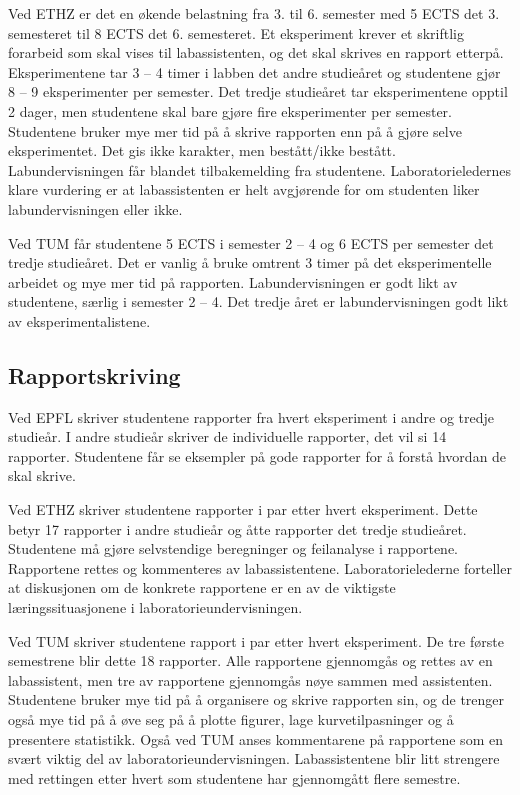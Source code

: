 \documentclass{article}
\begin{document}
Ved ETHZ er det en økende belastning fra 3. til 6. semester med 5 ECTS det 3. semesteret til 8 ECTS det 6. semesteret. Et eksperiment krever et skriftlig forarbeid som skal vises til labassistenten, og det skal skrives en rapport etterpå. Eksperimentene tar 3 – 4 timer i labben det andre studieåret og studentene gjør 8 – 9 eksperimenter per semester. Det tredje studieåret tar eksperimentene opptil 2 dager, men studentene skal bare gjøre fire eksperimenter per semester. Studentene bruker mye mer tid på å skrive rapporten enn på å gjøre selve eksperimentet. 
Det gis ikke karakter, men bestått/ikke bestått. Labundervisningen får blandet tilbakemelding fra studentene. Laboratorieledernes klare vurdering er at labassistenten er helt avgjørende for om studenten liker labundervisningen eller ikke.  

Ved TUM får studentene 5 ECTS i semester 2 – 4 og 6 ECTS per semester det tredje studieåret. Det er vanlig å bruke omtrent 3 timer på det eksperimentelle arbeidet og mye mer tid på rapporten. Labundervisningen er godt likt av studentene, særlig i semester 2 – 4. Det tredje året er labundervisningen godt likt av eksperimentalistene. 

\subsection{Rapportskriving}
Ved EPFL skriver studentene rapporter fra hvert eksperiment i andre og tredje studieår. I andre studieår skriver de individuelle rapporter, det vil si 14 rapporter. Studentene får se eksempler på gode rapporter for å forstå hvordan de skal skrive. 

Ved ETHZ skriver studentene rapporter i par etter hvert eksperiment. Dette betyr 17 rapporter i andre studieår og åtte rapporter det tredje studieåret. Studentene må gjøre selvstendige beregninger og feilanalyse i rapportene. Rapportene rettes og kommenteres av labassistentene. Laboratorielederne forteller at diskusjonen om de konkrete rapportene er en av de viktigste læringssituasjonene i laboratorieundervisningen. 

Ved TUM skriver studentene rapport i par etter hvert eksperiment. De tre første semestrene blir dette 18 rapporter. Alle rapportene gjennomgås og rettes av en labassistent, men tre av rapportene gjennomgås nøye sammen med assistenten. Studentene bruker mye tid på å organisere og skrive rapporten sin, og de trenger også mye tid på å øve seg på å plotte figurer, lage kurvetilpasninger og å presentere statistikk. Også ved TUM anses kommentarene på rapportene som en svært viktig del av laboratorieundervisningen. Labassistentene blir litt strengere med rettingen etter hvert som studentene har gjennomgått flere semestre.  
\end{document}
